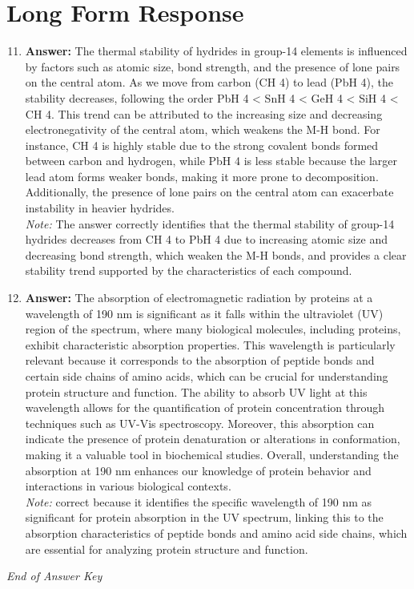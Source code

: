 \documentclass[12pt]{article}
\begin{document}
\section*{Long Form Response}
\begin{enumerate}[label=\arabic*.]
\setcounter{enumi}{10}
\item \textbf{Answer:} The thermal stability of hydrides in group-14 elements is influenced by factors such as atomic size, bond strength, and the presence of lone pairs on the central atom. As we move from carbon (CH 4) to lead (PbH 4), the stability decreases, following the order PbH 4 \textless{} SnH 4 \textless{} GeH 4 \textless{} SiH 4 \textless{} CH 4. This trend can be attributed to the increasing size and decreasing electronegativity of the central atom, which weakens the M-H bond. For instance, CH 4 is highly stable due to the strong covalent bonds formed between carbon and hydrogen, while PbH 4 is less stable because the larger lead atom forms weaker bonds, making it more prone to decomposition. Additionally, the presence of lone pairs on the central atom can exacerbate instability in heavier hydrides.
\\ \textit{Note:} The answer correctly identifies that the thermal stability of group-14 hydrides decreases from CH 4 to PbH 4 due to increasing atomic size and decreasing bond strength, which weaken the M-H bonds, and provides a clear stability trend supported by the characteristics of each compound.
\item \textbf{Answer:} The absorption of electromagnetic radiation by proteins at a wavelength of 190 nm is significant as it falls within the ultraviolet (UV) region of the spectrum, where many biological molecules, including proteins, exhibit characteristic absorption properties. This wavelength is particularly relevant because it corresponds to the absorption of peptide bonds and certain side chains of amino acids, which can be crucial for understanding protein structure and function. The ability to absorb UV light at this wavelength allows for the quantification of protein concentration through techniques such as UV-Vis spectroscopy. Moreover, this absorption can indicate the presence of protein denaturation or alterations in conformation, making it a valuable tool in biochemical studies. Overall, understanding the absorption at 190 nm enhances our knowledge of protein behavior and interactions in various biological contexts.
\\ \textit{Note:} correct because it identifies the specific wavelength of 190 nm as significant for protein absorption in the UV spectrum, linking this to the absorption characteristics of peptide bonds and amino acid side chains, which are essential for analyzing protein structure and function.
\end{enumerate}

\vfill
\noindent\textit{End of Answer Key}
\end{document}
